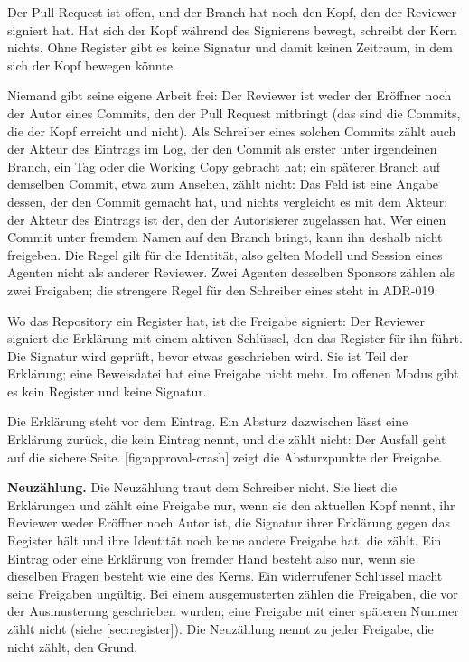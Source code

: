 \startitemize
\item Der Pull Request ist offen, und der Branch hat noch den Kopf, den der Reviewer signiert hat.
Hat sich der Kopf während des Signierens bewegt, schreibt der Kern nichts. Ohne Register gibt es
keine Signatur und damit keinen Zeitraum, in dem sich der Kopf bewegen könnte.
\item Niemand gibt seine eigene Arbeit frei: Der Reviewer ist weder der Eröffner noch der Autor
eines Commits, den der Pull Request mitbringt (das sind die Commits, die der Kopf erreicht und
 nicht).
Als Schreiber eines solchen Commits zählt auch der Akteur des Eintrags im Log, der den Commit
als erster unter irgendeinen Branch, ein Tag oder die Working Copy gebracht hat; ein späterer
Branch auf demselben Commit, etwa zum Ansehen, zählt nicht: Das Feld  ist eine Angabe
dessen, der den Commit gemacht hat, und nichts vergleicht es mit dem Akteur; der Akteur des
Eintrags ist der, den der Autorisierer zugelassen hat.
Wer einen Commit unter fremdem Namen auf den Branch bringt, kann ihn deshalb nicht freigeben.
Die Regel gilt für die Identität, also gelten Modell und Session eines Agenten nicht als anderer
Reviewer.
Zwei Agenten desselben Sponsors zählen als zwei Freigaben; die strengere Regel für den Schreiber
eines  steht in ADR-019.
\item Wo das Repository ein Register hat, ist die Freigabe signiert: Der Reviewer signiert die
Erklärung mit einem aktiven Schlüssel, den das Register für ihn führt.
Die Signatur wird geprüft, bevor etwas geschrieben wird.
Sie ist Teil der Erklärung; eine Beweisdatei hat eine Freigabe nicht mehr.
Im offenen Modus gibt es kein Register und keine Signatur.
\stopitemize

Die Erklärung steht vor dem Eintrag.
Ein Absturz dazwischen lässt eine Erklärung zurück, die kein Eintrag nennt, und die zählt nicht:
Der Ausfall geht auf die sichere Seite.
[fig:approval-crash] zeigt die Absturzpunkte der Freigabe.

\startplacefigure[title={Ablauf einer Freigabe mit Absturzpunkten},
    reference=fig:approval-crash,location=here]
\stopplacefigure

{\bf Neuzählung.}
Die Neuzählung traut dem Schreiber nicht.
Sie liest die Erklärungen und zählt eine Freigabe nur, wenn sie den aktuellen Kopf nennt,
ihr Reviewer weder Eröffner noch Autor ist, die Signatur ihrer Erklärung gegen das Register hält
und ihre Identität noch keine andere Freigabe hat, die zählt.
Ein Eintrag oder eine Erklärung von fremder Hand besteht also nur, wenn sie dieselben Fragen
besteht wie eine des Kerns.
Ein widerrufener Schlüssel macht seine Freigaben ungültig. Bei einem ausgemusterten zählen die
Freigaben, die vor der Ausmusterung geschrieben wurden; eine Freigabe mit einer späteren
Nummer zählt nicht (siehe [sec:register]).
Die Neuzählung nennt zu jeder Freigabe, die nicht zählt, den Grund.

